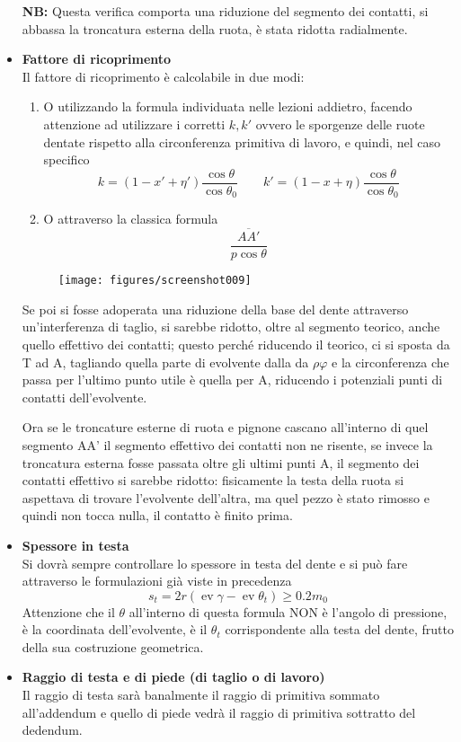 \documentclass[a4paper, 15pt]{article}
\DeclareMathOperator{\ev}{ev}
\begin{document}
\begin{adjustwidth}{2in}{}
\begin{itemize}
					\textbf{NB:} Questa verifica comporta una riduzione del segmento dei contatti, si abbassa la troncatura esterna della ruota, è stata ridotta radialmente. 
					
					\item \textbf{Fattore di ricoprimento}\\
					Il fattore di ricoprimento è calcolabile in due modi:
					\begin{enumerate}
					\item O utilizzando la formula individuata nelle lezioni addietro, facendo attenzione ad utilizzare i corretti $k, k'$ ovvero le sporgenze delle ruote dentate rispetto alla circonferenza primitiva di lavoro, e quindi, nel caso specifico
					\[k = (1-x'+\eta')\dfrac{\cos\theta}{\cos\theta_0} \qquad k' = (1-x+\eta)\dfrac{\cos\theta}{\cos\theta_0}\]
					\item O attraverso la classica formula 
					\[\dfrac{\overline{AA'}}{p\cos\theta}\]
					\end{enumerate}
					\begin{figure}[H]
						\centering
						\texttt{[image: figures/screenshot009]}
						\label{fig:screenshot009}
					\end{figure}
					
					Se poi si fosse adoperata una riduzione della base del dente attraverso un'interferenza di taglio, si sarebbe ridotto, oltre al segmento teorico, anche quello effettivo dei contatti; questo perché riducendo il teorico, ci si sposta da T ad A, tagliando quella parte di evolvente dalla da $\rho\varphi$ e la circonferenza che passa per l'ultimo punto utile è quella per A, riducendo i potenziali punti di contatti dell'evolvente. 
					
					Ora se le troncature esterne di ruota e pignone cascano all'interno di quel segmento AA' il segmento effettivo dei contatti non ne risente, se invece la troncatura esterna fosse passata oltre gli ultimi punti A, il segmento dei contatti effettivo si sarebbe ridotto: fisicamente la testa della ruota si aspettava di trovare l'evolvente dell'altra, ma quel pezzo è stato rimosso e quindi non tocca nulla, il contatto è finito prima. 
					
					\item \textbf{Spessore in testa}\\
					Si dovrà sempre controllare lo spessore in testa del dente e si può fare attraverso le formulazioni già viste in precedenza
					\[s_t = 2r(\ev\gamma-\ev\theta_t)\geq0.2m_0\]
					Attenzione che il $\theta$ all'interno di questa formula NON è l'angolo di pressione, è la coordinata dell'evolvente, è  il $\theta_t$ corrispondente alla testa del dente, frutto della sua costruzione geometrica. 
					
					\item \textbf{Raggio di testa e di piede (di taglio o di lavoro)}\\
					Il raggio di testa sarà banalmente il raggio di primitiva sommato all'addendum e quello di piede vedrà il raggio di primitiva sottratto del dedendum. 
				\end{itemize}
\end{adjustwidth}
\end{document}
